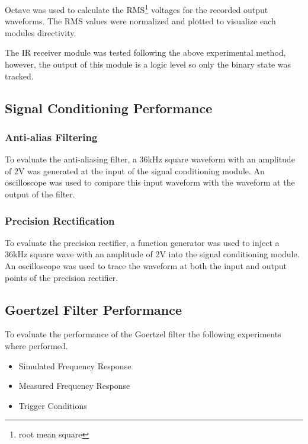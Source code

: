 Octave was used to calculate the RMS\footnote{root mean square} voltages for the recorded output waveforms. The RMS values were normalized and plotted to visualize each modules directivity.

The IR receiver module was tested following the above experimental method, however, the output of this module is a logic level so only the binary state was tracked.






\subsection{Signal Conditioning Performance}

\subsubsection{Anti-alias Filtering}
To evaluate the anti-aliasing filter, a 36kHz square waveform with an amplitude of 2V was generated at the input of the signal conditioning module. An oscilloscope was used to compare this input waveform with the waveform at the output of the filter.

\subsubsection{Precision Rectification}
To evaluate the precision rectifier, a function generator was used to inject a 36kHz square wave with an amplitude of 2V into the signal conditioning module. An oscilloscope was used to trace the waveform at both the input and output points of the precision rectifier.






\subsection{Goertzel Filter Performance}

To evaluate the performance of the Goertzel filter the following experiments where performed.

\begin{itemize}
	\item Simulated Frequency Response
	\item Measured Frequency Response
	\item Trigger Conditions
\end{itemize}

